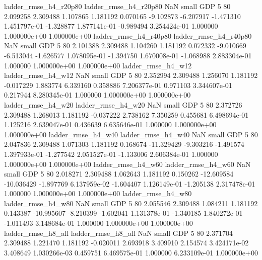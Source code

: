    ladder_rmse_h4_r20p80    ladder_rmse_h4_r20p80                   NaN      small      GDP                 5 80 2.099258       2.309488 1.107865       1.181192    0.070165     -9.102873     -6.207917    -1.471310   1.451797e-01 -1.328877 1.877141e-01    -0.989494   3.254424e-01            1.000000    1.000000e+00        1.000000e+00
   ladder_rmse_h4_r40p80    ladder_rmse_h4_r40p80                   NaN      small      GDP                 5 80 2.101388       2.309488 1.104260       1.181192    0.072332     -9.010669     -6.513044    -1.626577   1.078095e-01 -1.394750 1.670008e-01    -1.068988   2.883304e-01            1.000000    1.000000e+00        1.000000e+00
      ladder_rmse_h4_w12       ladder_rmse_h4_w12                   NaN      small      GDP                 5 80 2.352994       2.309488 1.256070       1.181192   -0.017229      1.883774      6.339160     0.358886   7.206377e-01  0.971103 3.344607e-01     0.217944   8.280345e-01            1.000000    1.000000e+00        1.000000e+00
      ladder_rmse_h4_w20       ladder_rmse_h4_w20                   NaN      small      GDP                 5 80 2.372726       2.309488 1.268013       1.181192   -0.037222      2.738162      7.350259     0.455681   6.498694e-01  1.125216 2.639047e-01     0.436639   6.635646e-01            1.000000    1.000000e+00        1.000000e+00
      ladder_rmse_h4_w40       ladder_rmse_h4_w40                   NaN      small      GDP                 5 80 2.047836       2.309488 1.071303       1.181192    0.168674    -11.329429     -9.303216    -1.491574   1.397933e-01 -1.277542 2.051527e-01    -1.133006   2.606384e-01            1.000000    1.000000e+00        1.000000e+00
      ladder_rmse_h4_w60       ladder_rmse_h4_w60                   NaN      small      GDP                 5 80 2.018271       2.309488 1.062643       1.181192    0.150262    -12.609584    -10.036429    -1.897769   6.137959e-02 -1.604407 1.126149e-01    -1.205138   2.317478e-01            1.000000    1.000000e+00        1.000000e+00
      ladder_rmse_h4_w80       ladder_rmse_h4_w80                   NaN      small      GDP                 5 80 2.055546       2.309488 1.084211       1.181192    0.143387    -10.995607     -8.210399    -1.602041   1.131378e-01 -1.340185 1.840272e-01    -1.011493   3.148684e-01            1.000000    1.000000e+00        1.000000e+00
      ladder_rmse_h8_all       ladder_rmse_h8_all                   NaN      small      GDP                 5 80 2.371704       2.309488 1.221470       1.181192   -0.020011      2.693918      3.409910     2.154574   3.424171e-02  3.408649 1.030266e-03     0.459751   6.469575e-01            1.000000    6.233109e-01        1.000000e+00
